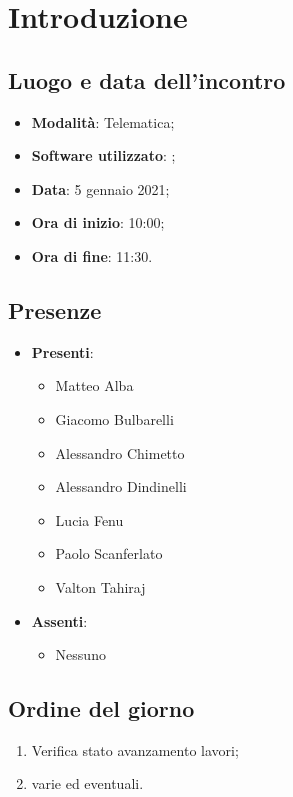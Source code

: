 \documentclass[]{article}
\begin{document}
	
	
	
	\newpage
	
	\section{Introduzione}
		\subsection{Luogo e data dell'incontro}
		\begin{itemize}
			\item \textbf{Modalità}: Telematica;
			\item \textbf{Software utilizzato}: ;
			\item \textbf{Data}: 5 gennaio 2021;
			\item \textbf{Ora di inizio}: 10:00;
			\item \textbf{Ora di fine}: 11:30.
		\end{itemize}

		\subsection{Presenze}
		\begin{itemize}
			\item \textbf{Presenti}:
		\begin{itemize}
			\item Matteo Alba
			\item Giacomo Bulbarelli
			\item Alessandro Chimetto
			\item Alessandro Dindinelli
			\item Lucia Fenu
			\item Paolo Scanferlato
			\item Valton Tahiraj
		\end{itemize}
			\item \textbf{Assenti}:
			\begin{itemize}
				\item Nessuno
			\end{itemize}
		\end{itemize}
	
		\subsection{Ordine del giorno}
		\begin{enumerate}
			\item Verifica stato avanzamento lavori;
			\item varie ed eventuali.
		\end{enumerate}
	
\end{document}
